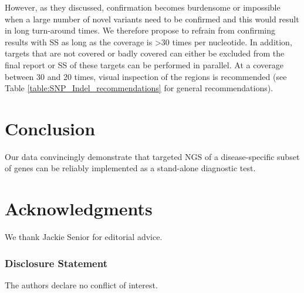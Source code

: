 However, as they discussed, confirmation becomes burdensome or impossible when a large number of novel variants need to be confirmed and this would result in long turn-around times. 
We therefore propose to refrain from confirming results with SS as long as the coverage is {\textgreater}30 times per nucleotide. 
In addition, targets that are not covered or badly covered can either be excluded from the final report or SS of these targets can be performed in parallel. 
At a coverage between 30 and 20 times, visual inspection of the regions is recommended (see Table \ref{table:SNP_Indel_recommendations} for general recommendations).

\section{Conclusion}
Our data convincingly demonstrate that targeted NGS of a disease-specific subset of genes can be reliably implemented as a stand-alone diagnostic test.

\section{Acknowledgments}\label{Acknowledgments} 
We thank Jackie Senior for editorial advice.


\subsubsection{Disclosure Statement} 
The authors declare no conflict of interest.

